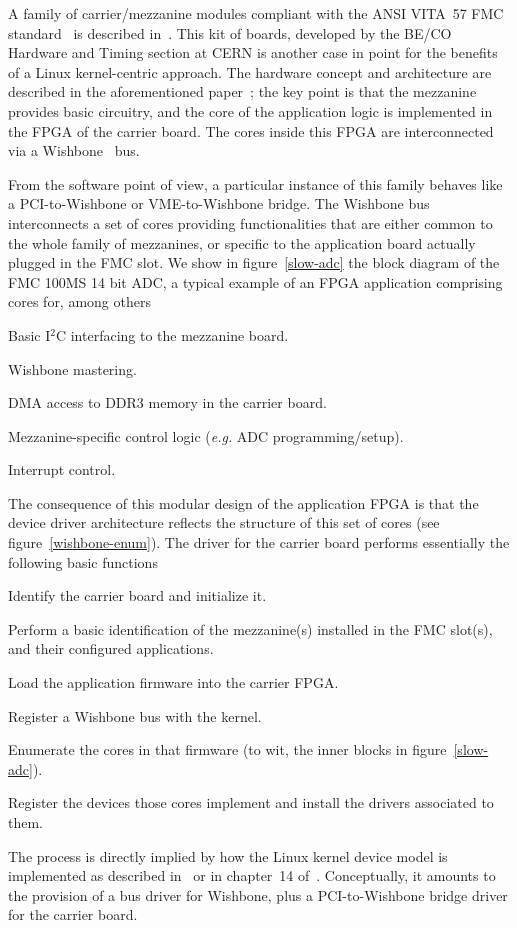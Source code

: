 \documentclass{JAC2003}
\begin{document}
A family of carrier/mezzanine modules compliant with the ANSI VITA~57
FMC standard~\cite{vita-fmc} is described in~\cite{fpga-fmc}. This kit
of boards, developed by the BE/CO Hardware and Timing section at CERN is
another case in point for the benefits of a Linux kernel-centric
approach. The hardware concept
and architecture are described in the aforementioned paper~\cite{fpga-fmc}; the
key point is that the mezzanine provides basic circuitry, and the core of the
application logic is implemented in the FPGA of the carrier board. The cores
inside this FPGA are interconnected via a Wishbone~\cite{wishbone-spec} bus.


From the software point of view, a particular instance of this family
behaves like a PCI-to-Wishbone or VME-to-Wishbone bridge. The Wishbone
bus interconnects a set of cores providing functionalities that are either
common to the whole family of mezzanines, or specific to the application
board actually plugged in the FMC slot. We show in figure~\ref{slow-adc}
the block diagram of the FMC 100MS 14 bit ADC, a typical example of an FPGA
application comprising cores for, among others

\begin{Itemize}
\item Basic I${}^2$C interfacing to the mezzanine board.
\item Wishbone mastering.
\item DMA access to DDR3 memory in the carrier board.
\item Mezzanine-specific control logic (\emph{e.g.} ADC programming/setup).
\item Interrupt control.
\end{Itemize}
The consequence of this modular design of the application FPGA is that
the device driver architecture reflects the structure of this set of cores
(see figure~\ref{wishbone-enum}). The driver for the carrier board performs
essentially the following basic functions
\begin{Itemize}
\item Identify the carrier board and initialize it.
\item Perform a basic identification of the mezzanine(s) installed in
    the FMC slot(s), and their configured applications.
\item Load the application firmware into the carrier FPGA.
\item Register a Wishbone bus with the kernel.
\item Enumerate the cores in that firmware (to wit, the
    inner blocks in figure~\ref{slow-adc}).
\item Register the devices those cores implement and install the drivers
    associated to them.
\end{Itemize}
The process is directly implied by how the Linux kernel device model
is implemented as described in~\cite{device-model} or in chapter~14
of~\cite{rubini}. Conceptually, it amounts to the provision of a bus driver
for Wishbone, plus a PCI-to-Wishbone bridge driver for the carrier board.
\end{document}

